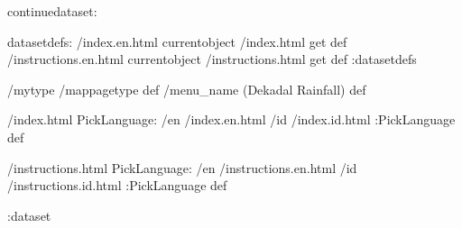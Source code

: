 \begin{ingrid}
continuedataset:

datasetdefs:
/index.en.html currentobject /index.html get def
/instructions.en.html currentobject /instructions.html get def
:datasetdefs

/mytype /mappagetype def
/menu_name (Dekadal Rainfall) def

/index.html {
PickLanguage:
/en /index.en.html
/id /index.id.html
:PickLanguage
} def

/instructions.html {
PickLanguage:
/en /instructions.en.html
/id /instructions.id.html
:PickLanguage
} def

:dataset
\end{ingrid}
